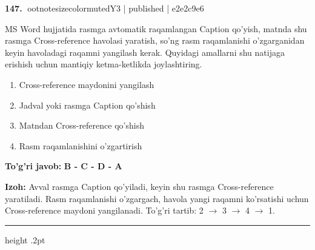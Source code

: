 \documentclass[10pt,a4paper]{article}
\begin{document}
\textbf{\color{ink}147.} {ootnotesizecolor{muted}Y3 | published | e2e2c9e6}
\par
MS Word hujjatida rasmga avtomatik raqamlangan Caption qo'yish, matnda shu rasmga Cross-reference havolasi yaratish, so'ng rasm raqamlanishi o'zgarganidan keyin havoladagi raqamni yangilash kerak. Quyidagi amallarni shu natijaga erishish uchun mantiqiy ketma-ketlikda joylashtiring.
\begin{enumerate}[label=\Alph*),leftmargin=9mm]
\item Cross-reference maydonini yangilash
\item Jadval yoki rasmga Caption qo'shish
\item Matndan Cross-reference qo'shish
\item Rasm raqamlanishini o'zgartirish
\end{enumerate}
\begin{tcolorbox}[enhanced,breakable,colback=teal!4,colframe=teal!55!black,boxrule=0.45pt,arc=1.2mm,left=2.8mm,right=2.8mm,top=2mm,bottom=2mm]
\textbf{\color{teal}To'g'ri javob:} \textbf{B - C - D - A}
\par\smallskip
\textbf{Izoh:} Avval rasmga Caption qo'yiladi, keyin shu rasmga Cross-reference yaratiladi. Rasm raqamlanishi o'zgargach, havola yangi raqamni ko'rsatishi uchun Cross-reference maydoni yangilanadi. To'g'ri tartib: 2 \ensuremath{\rightarrow} 3 \ensuremath{\rightarrow} 4 \ensuremath{\rightarrow} 1.
\end{tcolorbox}
\vspace{2mm}\hrule height .2pt\vspace{2mm}
\end{document}
